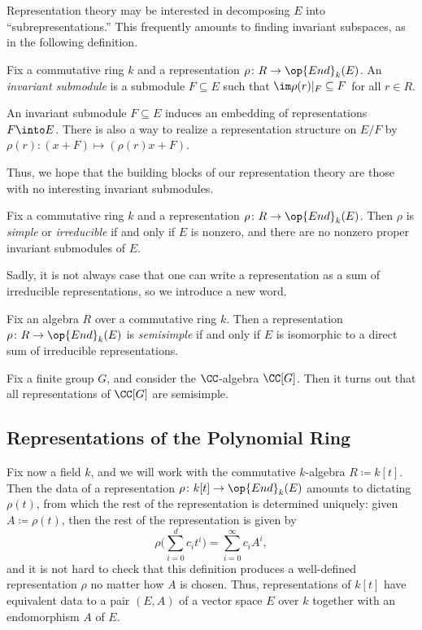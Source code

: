 \documentclass[../notes.tex]{subfiles}
\begin{document}
Representation theory may be interested in decomposing $E$ into ``subrepresentations.'' This frequently amounts to finding invariant subspaces, as in the following definition.
\begin{definition}
	Fix a commutative ring $k$ and a representation $\rho\colon R\to\op{End}_k(E)$. An \textit{invariant submodule} is a submodule $F\subseteq E$ such that $\im\rho(r)|_F\subseteq F$ for all $r\in R$.
\end{definition}
\begin{remark}
	An invariant submodule $F\subseteq E$ induces an embedding of representations $F\into E$. There is also a way to realize a representation structure on $E/F$ by $\rho(r)\colon(x+F)\mapsto(\rho(r)x+F)$.
\end{remark}
Thus, we hope that the building blocks of our representation theory are those with no interesting invariant submodules.
\begin{definition}[irreducible]
	Fix a commutative ring $k$ and a representation $\rho\colon R\to\op{End}_k(E)$. Then $\rho$ is \textit{simple} or \textit{irreducible} if and only if $E$ is nonzero, and there are no nonzero proper invariant submodules of $E$.
\end{definition}
Sadly, it is not always case that one can write a representation as a sum of irreducible representations, so we introduce a new word.
\begin{definition}[semisimple]
	Fix an algebra $R$ over a commutative ring $k$. Then a representation $\rho\colon R\to\op{End}_k(E)$ is \textit{semisimple} if and only if $E$ is isomorphic to a direct sum of irreducible representations.
\end{definition}
\begin{example}[Maschke]
	Fix a finite group $G$, and consider the $\CC$-algebra $\CC[G]$. Then it turns out that all representations of $\CC[G]$ are semisimple.
\end{example}

\subsection{Representations of the Polynomial Ring}
Fix now a field $k$, and we will work with the commutative $k$-algebra $R\coloneqq k[t]$. Then the data of a representation $\rho\colon k[t]\to\op{End}_k(E)$ amounts to dictating $\rho(t)$, from which the rest of the representation is determined uniquely: given $A\coloneqq\rho(t)$, then the rest of the representation is given by
\[\rho\Bigg(\sum_{i=0}^d c_it^i\Bigg)=\sum_{i=0}^\infty c_iA^i,\]
and it is not hard to check that this definition produces a well-defined representation $\rho$ no matter how $A$ is chosen. Thus, representations of $k[t]$ have equivalent data to a pair $(E,A)$ of a vector space $E$ over $k$ together with an endomorphism $A$ of $E$.
\end{document}
